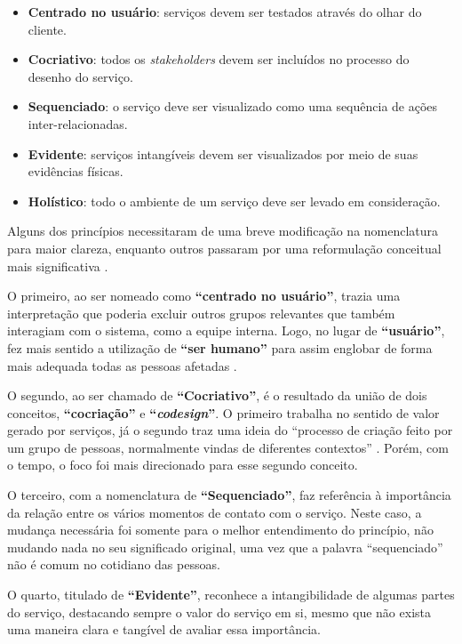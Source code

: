 \begin{itemize}
	\item \textbf{Centrado no usuário}: serviços devem ser testados através do olhar do cliente.
	\item \textbf{Cocriativo}: todos os \textit{stakeholders} devem ser incluídos no processo do desenho do serviço.
	\item \textbf{Sequenciado}: o serviço deve ser visualizado como uma sequência de ações inter-relacionadas.
	\item \textbf{Evidente}: serviços intangíveis devem ser visualizados por meio de suas evidências físicas.
	\item \textbf{Holístico}: todo o ambiente de um serviço deve ser levado em consideração.
\end{itemize}

Alguns dos princípios necessitaram de uma breve modificação na nomenclatura para maior clareza, enquanto outros passaram por uma reformulação conceitual mais significativa \cite{Stickdorn2019}.

O primeiro, ao ser nomeado como \textbf{``centrado no usuário''}, trazia uma interpretação que poderia excluir outros grupos relevantes que também interagiam com o sistema, como a equipe interna. Logo, no lugar de \textbf{``usuário''}, fez mais sentido a utilização de \textbf{``ser humano''} para assim englobar de forma mais adequada todas as pessoas afetadas \cite{Stickdorn2019}.

O segundo, ao ser chamado de \textbf{``Cocriativo''}, é o resultado da união de dois conceitos, \textbf{``cocriação''} e \textbf{``\textit{codesign}''}. O primeiro trabalha no sentido de valor gerado por serviços, já o segundo traz uma ideia do ``processo de criação feito por um grupo de pessoas, normalmente vindas de diferentes contextos'' \cite{Stickdorn2019}. Porém, com o tempo, o foco foi mais direcionado para esse segundo conceito.

O terceiro, com a nomenclatura de \textbf{``Sequenciado''}, faz referência à importância da relação entre os vários momentos de contato com o serviço. Neste caso, a mudança necessária foi somente para o melhor entendimento do princípio, não mudando nada no seu significado original, uma vez que a palavra ``sequenciado'' não é comum no cotidiano das pessoas.

O quarto, titulado de \textbf{``Evidente''}, reconhece a intangibilidade de algumas partes do serviço, destacando sempre o valor do serviço em si, mesmo que não exista uma maneira clara e tangível de avaliar essa importância.


